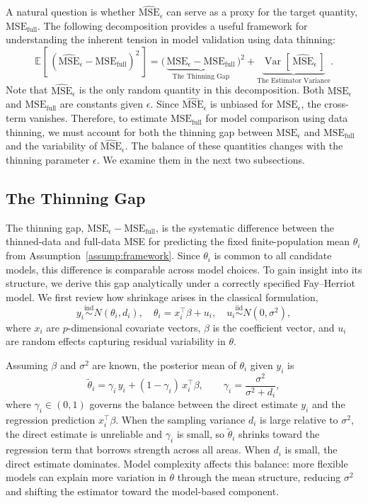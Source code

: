 \documentclass[11pt]{article}
\newcommand{\iid}{\stackrel{\text{iid}}{\sim}}
\newcommand{\ind}{\stackrel{\text{ind}}{\sim}}
\newcommand{\msehat}{\widehat{\mathrm{MSE}}_{\epsilon}}
\newcommand{\msethin}{\mathrm{MSE}_{\epsilon}}
\newcommand{\msefull}{\mathrm{MSE}_{\mathrm{full}}}
\newcommand{\E}[2][]{\mathbb{E}_{#1}\!\left[\,#2\,\right]}
\newcommand{\Var}[2][]{\operatorname{Var}_{#1}\!\left[\,#2\,\right]}
\newcommand{\N}[2]{N\!\left(#1, #2\right)}
\theoremstyle{plain}
\theoremstyle{definition}
\theoremstyle{remark}
\begin{document}
A natural question is whether $\msehat$ can serve as a proxy for the target quantity, $\msefull$. The following decomposition provides a useful framework for understanding the inherent tension in model validation using data thinning:
\begin{equation}\label{eq:tradeoff}
        \E{(\msehat - \msefull)^2} = \bigg(\, \underbrace{\msethin - \msefull}_{\text{The Thinning Gap}}\, \bigg)^2 +
        \underbrace{\Var{\msehat}}_{\text{The Estimator Variance}}.
\end{equation}
Note that $\msehat$ is the only random quantity in this decomposition. Both $\msethin$ and $\msefull$ are constants given $\epsilon$. Since $\msehat$ is unbiased for $\msethin$, the cross-term vanishes. Therefore, to estimate $\msefull$ for model comparison using data thinning, we must account for both the thinning gap between $\msethin$ and $\msefull$ and the variability of $\msehat$. The balance of these quantities changes with the thinning parameter $\epsilon$. We examine them in the next two subsections.


\subsection{The Thinning Gap}\label{sec:thinning_gap}

The thinning gap, $\msethin - \msefull$, is the systematic difference between the thinned-data and full-data MSE for predicting the fixed finite-population mean $\theta_i$ from Assumption~\ref{assump:framework}. Since $\theta_i$ is common to all candidate models, this difference is comparable across model choices. To gain insight into its structure, we derive this gap analytically under a correctly specified Fay--Herriot model. We first review how shrinkage arises in the classical formulation,
\[
y_i \ind \N{\theta_i}{d_i}, \quad \theta_i = x_i^\top \beta + u_i, \quad u_i \iid N(0, \sigma^2),
\]
where $x_i$ are $p$-dimensional covariate vectors, $\beta$ is the coefficient vector, and $u_i$ are random effects capturing residual variability in $\theta$.

Assuming $\beta$ and $\sigma^2$ are known, the posterior mean of $\theta_i$ given $y_i$ is
\[
\tilde{\theta}_i = \gamma_i \, y_i + (1 - \gamma_i) \, x_i^\top \beta, \qquad \gamma_i = \frac{\sigma^2}{\sigma^2 + d_i},
\]
where $\gamma_i \in (0,1)$ governs the balance between the direct estimate $y_i$ and the regression prediction $x_i^\top\beta$. When the sampling variance $d_i$ is large relative to $\sigma^2$, the direct estimate is unreliable and $\gamma_i$ is small, so $\tilde{\theta}_i$ shrinks toward the regression term that borrows strength across all areas. When $d_i$ is small, the direct estimate dominates. Model complexity affects this balance: more flexible models can explain more variation in $\theta$ through the mean structure, reducing $\sigma^2$ and shifting the estimator toward the model-based component.
\end{document}
